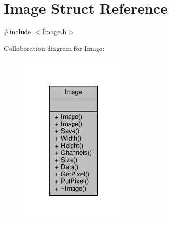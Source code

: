 \hypertarget{structImage}{}\section{Image Struct Reference}
\label{structImage}


{\ttfamily \#include $<$Image.\+h$>$}



Collaboration diagram for Image\+:\nopagebreak
\begin{figure}[H]
\begin{center}
\leavevmode
\includegraphics[width=153pt]{structImage__coll__graph}
\end{center}
\end{figure}

